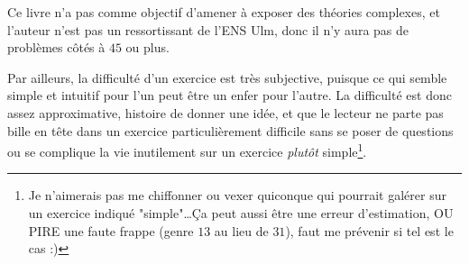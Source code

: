 \documentclass[../main.tex]{subfiles}
\begin{document}
Ce livre n'a pas comme objectif d'amener à exposer des théories complexes, et l'auteur n'est pas un ressortissant de l'ENS Ulm, donc il n'y aura pas de problèmes côtés à $45$ ou plus.

Par ailleurs, la difficulté d'un exercice est très subjective, puisque ce qui semble simple et intuitif pour l'un peut être un enfer pour l'autre. La difficulté est donc assez approximative, histoire de donner une idée, et que le lecteur ne parte pas bille en tête dans un exercice particulièrement difficile sans se poser de questions ou se complique la vie inutilement sur un exercice \textit{plutôt} simple\footnote{Je n'aimerais pas me chiffonner ou vexer quiconque qui pourrait galérer sur un exercice indiqué "simple"\dots Ça peut aussi être une erreur d'estimation, OU PIRE une faute frappe (genre $13$ au lieu de $31$), faut me prévenir si tel est le cas :)}.
\newpage
\end{document}
